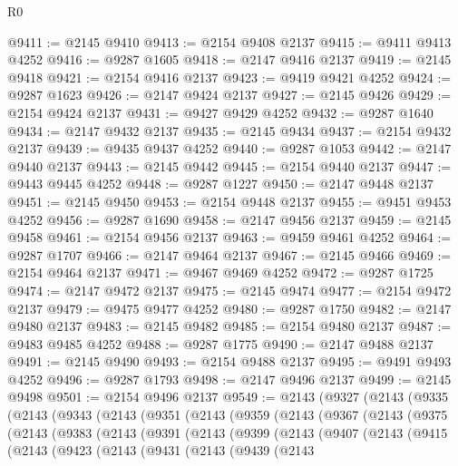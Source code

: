 \begin{lexlean}{R0}
\begin{coremodule}
@9411 := @2145 @9410
@9413 := @2154 @9408 @2137
@9415 := @9411 @9413 @4252
@9416 := @9287 @1605
@9418 := @2147 @9416 @2137
@9419 := @2145 @9418
@9421 := @2154 @9416 @2137
@9423 := @9419 @9421 @4252
@9424 := @9287 @1623
@9426 := @2147 @9424 @2137
@9427 := @2145 @9426
@9429 := @2154 @9424 @2137
@9431 := @9427 @9429 @4252
@9432 := @9287 @1640
@9434 := @2147 @9432 @2137
@9435 := @2145 @9434
@9437 := @2154 @9432 @2137
@9439 := @9435 @9437 @4252
@9440 := @9287 @1053
@9442 := @2147 @9440 @2137
@9443 := @2145 @9442
@9445 := @2154 @9440 @2137
@9447 := @9443 @9445 @4252
@9448 := @9287 @1227
@9450 := @2147 @9448 @2137
@9451 := @2145 @9450
@9453 := @2154 @9448 @2137
@9455 := @9451 @9453 @4252
@9456 := @9287 @1690
@9458 := @2147 @9456 @2137
@9459 := @2145 @9458
@9461 := @2154 @9456 @2137
@9463 := @9459 @9461 @4252
@9464 := @9287 @1707
@9466 := @2147 @9464 @2137
@9467 := @2145 @9466
@9469 := @2154 @9464 @2137
@9471 := @9467 @9469 @4252
@9472 := @9287 @1725
@9474 := @2147 @9472 @2137
@9475 := @2145 @9474
@9477 := @2154 @9472 @2137
@9479 := @9475 @9477 @4252
@9480 := @9287 @1750
@9482 := @2147 @9480 @2137
@9483 := @2145 @9482
@9485 := @2154 @9480 @2137
@9487 := @9483 @9485 @4252
@9488 := @9287 @1775
@9490 := @2147 @9488 @2137
@9491 := @2145 @9490
@9493 := @2154 @9488 @2137
@9495 := @9491 @9493 @4252
@9496 := @9287 @1793
@9498 := @2147 @9496 @2137
@9499 := @2145 @9498
@9501 := @2154 @9496 @2137
@9549 := @2143
    (@9327
      (@2143
        (@9335
          (@2143
            (@9343
              (@2143
                (@9351
                  (@2143
                    (@9359
                      (@2143
                        (@9367
                          (@2143
                            (@9375
                              (@2143
                                (@9383
                                  (@2143
                                    (@9391
                                      (@2143
                                        (@9399
                                          (@2143
                                            (@9407
                                              (@2143
                                                (@9415
                                                  (@2143
                                                    (@9423
                                                      (@2143
                                                        (@9431
                                                          (@2143
                                                            (@9439
                                                              (@2143

\end{coremodule}
\end{lexlean}
